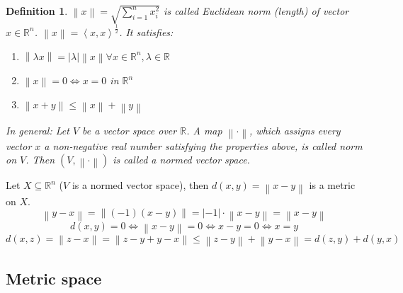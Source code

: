 \documentclass{article}
\newtheorem{definition}{Definition}  \numberwithin{definition}{section}
\newcommand{\angel}[1]{\left\langle#1\right\rangle}
\newcommand{\norm}[1]{\left\|#1\right\|}
\newcommand{\card}[1]{\left|#1\right|}
\begin{document}
\begin{definition}
  $\norm{x} = \sqrt{\sum_{i=1}^n x_i^2}$ is called \emph{Euclidean norm} (length) of vector $x \in \mathbb R^n$. $\norm{x} = \angel{x, x}^{\frac12}$.
  It satisfies:
  \begin{enumerate}
    \item $\norm{\lambda x} = \card{\lambda} \norm{x} \forall x \in \mathbb R^n, \lambda \in \mathbb R$
    \item $\norm{x} = 0 \iff x = 0$ in $\mathbb R^n$
    \item $\norm{x + y} \leq \norm{x} + \norm{y}$
  \end{enumerate}
  In general:
    Let $V$ be a vector space over $\mathbb R$.
    A map $\norm\cdot$,
      which assigns every vector $x$ a non-negative real number satisfying the properties above,
      is called \emph{norm on $V$}.
    Then $(V, \norm\cdot)$ is called a \emph{normed vector space}.
\end{definition}

Let $X \subseteq \mathbb R^n$ ($V$ is a normed vector space), then $d(x, y) = \norm{x - y}$ is a metric on $X$.
\[ \norm{y - x} = \norm{(-1) (x - y)} = \card{-1} \cdot \norm{x - y} = \norm{x - y} \]
\[ d(x, y) = 0 \iff \norm{x - y} = 0 \iff x - y = 0 \iff x = y \]
\[ d(x, z) = \norm{z - x} = \norm{z - y + y - x} \leq \norm{z - y} + \norm{y - x} = d(z, y) + d(y, x) \]

\subsection{Metric space}
\end{document}
